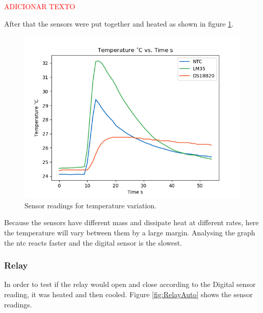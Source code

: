 \documentclass[12pt]{article}
\begin{document}
        \textcolor{red}{ADICIONAR TEXTO}
        
        After that the sensors were put together and heated as shown in figure \ref{fig:VarTemp}.

        \begin{figure}[H] 
            \centering
            \includegraphics*[scale = 0.5]{images/VarTempTest.png}
            \caption{Sensor readings for temperature variation.}
            \label{fig:VarTemp}
        \end{figure}

        Because the sensors have different mass and dissipate heat at different rates, here the temperature will vary between them by a large margin. Analysing the graph the ntc reacts faster and the digital sensor is the slowest.  


    \subsubsection{ Relay }
        In order to test if the relay would open and close according to the Digital sensor reading, it was heated and then cooled. Figure \ref{fig:RelayAuto} shows the sensor readings. 
\end{document}
